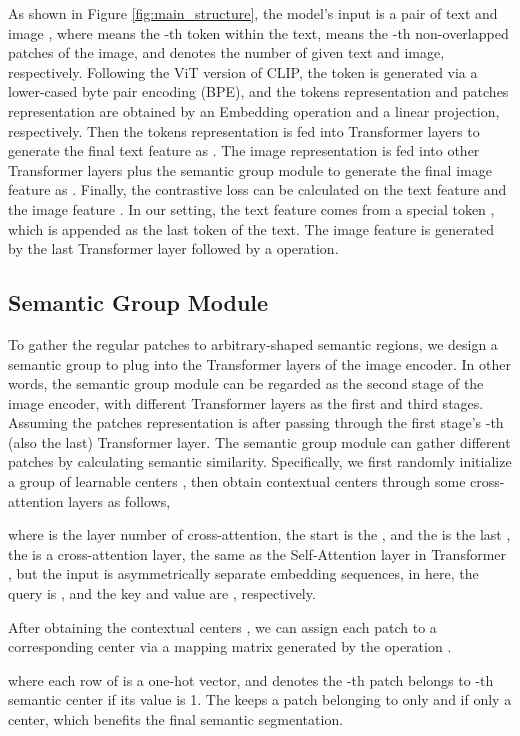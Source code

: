 \documentclass{article}
\theoremstyle{plain}
\theoremstyle{definition}
\theoremstyle{remark}
\begin{document}
As shown in Figure \ref{fig:main_structure}, the model's input is a pair of text  and image , where  means the -th token within the text,  means the -th non-overlapped patches of the image,  and  denotes the number of given text and image, respectively. Following the ViT version of CLIP, the token is generated via a lower-cased byte pair encoding (BPE), and the tokens representation  and patches representation  are obtained by an Embedding operation and a linear projection, respectively. Then the tokens representation is fed into Transformer layers \cite{Vaswani2017} to generate the final text feature as . The image representation is fed into other Transformer layers plus the semantic group module to generate the final image feature as . Finally, the contrastive loss can be calculated on the text feature  and the image feature . In our setting, the text feature  comes from a special token , which is appended as the last token of the text. The image feature  is generated by the last Transformer layer followed by a  operation.

\subsection{Semantic Group Module}
To gather the regular patches to arbitrary-shaped semantic regions, we design a semantic group to plug into the Transformer layers of the image encoder. In other words, the semantic group module can be regarded as the second stage of the image encoder, with different Transformer layers as the first and third stages. Assuming the patches representation is  after passing through the first stage's -th (also the last) Transformer layer. The semantic group module can gather different patches by calculating semantic similarity. Specifically, we first randomly initialize a group of learnable centers , then obtain contextual centers  through some cross-attention layers as follows,

where  is the layer number of cross-attention, the start  is the , and the  is the last , the  is a cross-attention layer, the same as the Self-Attention layer in Transformer \cite{Vaswani2017}, but the input is asymmetrically separate embedding sequences, in here, the query is , and the key and value are , respectively.

After obtaining the contextual centers , we can assign each patch to a corresponding center via a mapping matrix  generated by the  operation \cite{Jang2017Gumbel,Xu2022GroupViT}. 

where each row of  is a one-hot vector, and  denotes the -th patch belongs to -th semantic center if its value is 1. The  keeps a patch belonging to only and if only a center, which benefits the final semantic segmentation. 
\end{document}

